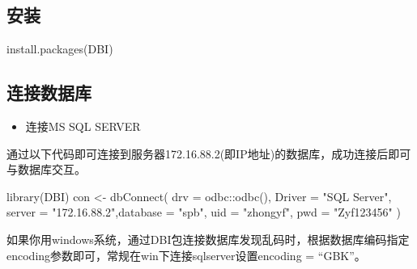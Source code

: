 \documentclass[
]{book}
\newenvironment{Shaded}{\begin{snugshade}}{\end{snugshade}}
\newcommand{\AttributeTok}[1]{\textcolor[rgb]{0.77,0.63,0.00}{#1}}
\newcommand{\FunctionTok}[1]{\textcolor[rgb]{0.00,0.00,0.00}{#1}}
\newcommand{\NormalTok}[1]{#1}
\newcommand{\OtherTok}[1]{\textcolor[rgb]{0.56,0.35,0.01}{#1}}
\newcommand{\SpecialCharTok}[1]{\textcolor[rgb]{0.00,0.00,0.00}{#1}}
\newcommand{\StringTok}[1]{\textcolor[rgb]{0.31,0.60,0.02}{#1}}
\providecommand{\tightlist}{%
  \setlength{\itemsep}{0pt}\setlength{\parskip}{0pt}}
\begin{document}
\hypertarget{ux5b89ux88c5-2}{%
\subsection{安装}\label{ux5b89ux88c5-2}}

\begin{Shaded}
\begin{Highlighting}[]
\FunctionTok{install.packages}\NormalTok{(}\StringTok{\textquotesingle{}DBI\textquotesingle{}}\NormalTok{)}
\end{Highlighting}
\end{Shaded}

\hypertarget{ux8fdeux63a5ux6570ux636eux5e93}{%
\subsection{连接数据库}\label{ux8fdeux63a5ux6570ux636eux5e93}}

\begin{itemize}
\tightlist
\item
  连接MS SQL SERVER
\end{itemize}

通过以下代码即可连接到服务器172.16.88.2(即IP地址)的数据库，成功连接后即可与数据库交互。

\begin{Shaded}
\begin{Highlighting}[]
\FunctionTok{library}\NormalTok{(DBI)}
\NormalTok{con }\OtherTok{\textless{}{-}} \FunctionTok{dbConnect}\NormalTok{(}
  \AttributeTok{drv =}\NormalTok{ odbc}\SpecialCharTok{::}\FunctionTok{odbc}\NormalTok{(), }\AttributeTok{Driver =} \StringTok{"SQL Server"}\NormalTok{, }\AttributeTok{server =} \StringTok{"172.16.88.2"}\NormalTok{,}\AttributeTok{database =} \StringTok{"spb"}\NormalTok{, }\AttributeTok{uid =} \StringTok{"zhongyf"}\NormalTok{, }\AttributeTok{pwd =} \StringTok{"Zyf123456"}
\NormalTok{)}
\end{Highlighting}
\end{Shaded}

如果你用windows系统，通过DBI包连接数据库发现乱码时，根据数据库编码指定encoding参数即可，常规在win下连接sqlserver设置encoding = ``GBK''。
\end{document}
